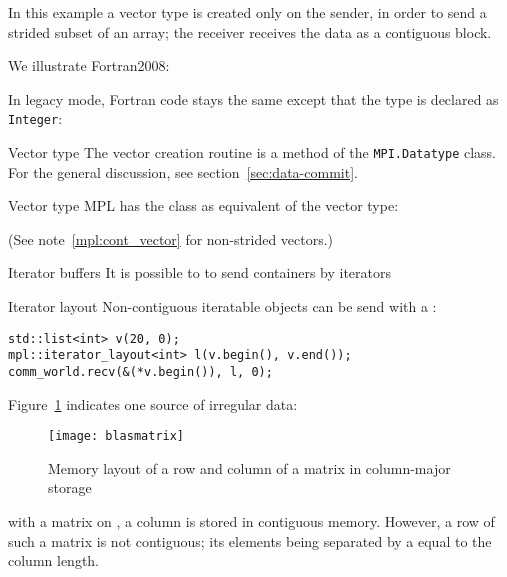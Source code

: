 In this example a vector type is created only on the sender, in order to send
a strided subset of an array; the receiver receives the data as a contiguous block.

We illustrate Fortran2008:
%

In legacy mode, Fortran code stays the same except that the type is
declared as \lstinline{Integer}:
%

\begin{pythonnote}{Vector type}
  The vector creation routine is a method of the
  \lstinline+MPI.Datatype+  class. 
  For the general discussion, see section~\ref{sec:data-commit}.
\end{pythonnote}


\begin{mplnote}{Vector type}
  \label{mpl:strided_vector}
  MPL has the  class as equivalent
  of the vector type:

  (See note~\ref{mpl:cont_vector} for non-strided vectors.)
\end{mplnote}

\begin{mplnote}{Iterator buffers}
  It is possible to to send containers by iterators
\end{mplnote}

\begin{mplnote}{Iterator layout}
  Non-contiguous iteratable objects can be send with a
  :
\begin{lstlisting}
std::list<int> v(20, 0);
mpl::iterator_layout<int> l(v.begin(), v.end());
comm_world.recv(&(*v.begin()), l, 0);  
\end{lstlisting}
\end{mplnote}

Figure~\ref{fig:blasmatrix} indicates one source of irregular
data:
%
\begin{figure}[t]
  \texttt{[image: blasmatrix]}
  \caption{Memory layout of a row and column of a matrix in column-major storage}
  \label{fig:blasmatrix}
\end{figure}
%
with a matrix on , a column is
stored in contiguous memory. However, a row of such a matrix
is not contiguous; its elements being separated by a 
equal to the column length.

